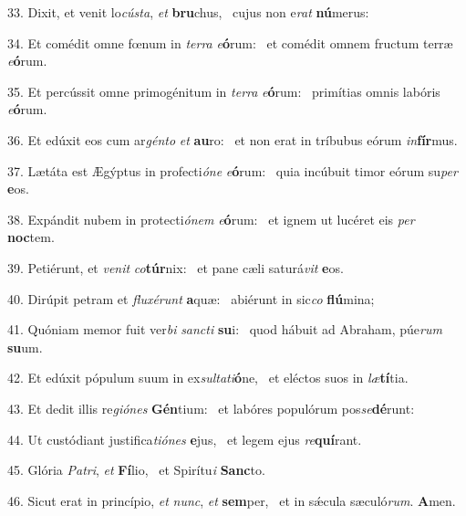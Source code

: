 33. Dixit, et venit lo\textit{cús}\textit{ta}, \textit{et} \textbf{bru}chus, \ast\  cujus non e\textit{rat} \textbf{nú}merus:\

34. Et comédit omne fœnum in \textit{ter}\textit{ra} \textit{e}\textbf{ó}rum: \ast\  et comédit omnem fructum terræ \textit{e}\textbf{ó}rum.\

35. Et percússit omne primogénitum in \textit{ter}\textit{ra} \textit{e}\textbf{ó}rum: \ast\  primítias omnis labóris \textit{e}\textbf{ó}rum.\

36. Et edúxit eos cum ar\textit{gén}\textit{to} \textit{et} \textbf{au}ro: \ast\  et non erat in tríbubus eórum \textit{in}\textbf{fír}mus.\

37. Lætáta est Ægýptus in profecti\textit{ó}\textit{ne} \textit{e}\textbf{ó}rum: \ast\  quia incúbuit timor eórum su\textit{per} \textbf{e}os.\

38. Expándit nubem in protecti\textit{ó}\textit{nem} \textit{e}\textbf{ó}rum: \ast\  et ignem ut lucéret eis \textit{per} \textbf{noc}tem.\

39. Petiérunt, et \textit{ve}\textit{nit} \textit{co}\textbf{túr}nix: \ast\  et pane cæli saturá\textit{vit} \textbf{e}os.\

40. Dirúpit petram et \textit{flu}\textit{xé}\textit{runt} \textbf{a}quæ: \ast\  abiérunt in sic\textit{co} \textbf{flú}mina;\

41. Quóniam memor fuit ver\textit{bi} \textit{sanc}\textit{ti} \textbf{su}i: \ast\  quod hábuit ad Abraham, púe\textit{rum} \textbf{su}um.\

42. Et edúxit pópulum suum in ex\textit{sul}\textit{ta}\textit{ti}\textbf{ó}ne, \ast\  et eléctos suos in \textit{læ}\textbf{tí}tia.\

43. Et dedit illis re\textit{gi}\textit{ó}\textit{nes} \textbf{Gén}tium: \ast\  et labóres populórum pos\textit{se}\textbf{dé}runt:\

44. Ut custódiant justifica\textit{ti}\textit{ó}\textit{nes} \textbf{e}jus, \ast\  et legem ejus \textit{re}\textbf{quí}rant.\

45. Glória \textit{Pa}\textit{tri}, \textit{et} \textbf{Fí}lio, \ast\  et Spirítu\textit{i} \textbf{Sanc}to.\

46. Sicut erat in princípio, \textit{et} \textit{nunc}, \textit{et} \textbf{sem}per, \ast\  et in sǽcula sæculó\textit{rum}. \textbf{A}men.\

